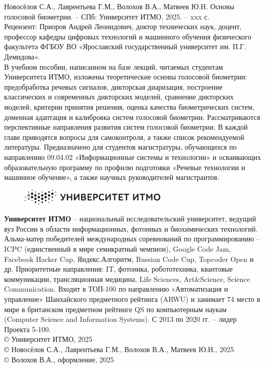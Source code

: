 \documentclass[12pt]{book}
\begin{document}
\thispagestyle{empty}

\noindent\large{Новосёлов С.А., Лаврентьева Г.М., Волохов В.А., Матвеев Ю.Н. Основы голосовой биометрии. – СПб: Университет ИТМО, 2025. – xxx с.} \\ [1ex]

\noindent\large{Рецензент: Приоров Андрей Леонидович, доктор технических наук, доцент, профессор кафедры цифровых технологий и машинного обучения физического факультета ФГБОУ ВО «Ярославский государственный университет им. П.Г. Демидова».} \\ [1ex]

\noindent\large{В учебном пособии, написанном на базе лекций, читаемых студентам Университета ИТМО, изложены теоретические основы голосовой биометрии: предобработка речевых сигналов, дикторская диаризация, построение классических и современных дикторских моделей, сравнение дикторских моделей, критерии принятия решения, оценка качества биометрических систем, доменная адаптация и калибровка систем голосовой биометрии. Рассматриваются перспективные направления развития систем голосовой биометрии. В каждой главе приводятся вопросы для самоконтроля, а также список рекомендуемой литературы. Предназначено для студентов магистратуры, обучающихся по направлению 09.04.02 «Информационные системы и технологии» и осваивающих образовательную программу по профилю подготовки «Речевые технологии и машинное обучение», а также научных руководителей магистрантов.}

\begin{figure}[h]
\includegraphics[width=7cm, right]{images/cover/logo_bw.png}
\end{figure}

\noindent\large{\textbf{Университет ИТМО} – национальный исследовательский университет, ведущий вуз России в области информационных, фотонных и биохимических технологий. Альма-матер победителей международных соревнований по программированию – ICPC (единственный в мире семикратный чемпион), Google Code Jam, Facebook Hacker Cup, Яндекс.Алгоритм, Russian Code Cup, Topcoder Open и др. Приоритетные направления: IT, фотоника, робототехника, квантовые коммуникации, трансляционная медицина, Life Sciences, Art\&Science, Science Communication. Входит в ТОП-100 по направлению «Автоматизация и управление» Шанхайского предметного рейтинга (ARWU) и занимает 74 место в мире в британском предметном рейтинге QS по компьютерным наукам (Computer Science and Information Systems). С 2013 по 2020 гг. – лидер Проекта 5-100.} \\ [1ex]

\noindent\large{\copyright \! Университет ИТМО, 2025 \\ 
\copyright \! Новосёлов С.А., Лаврентьева Г.М., Волохов В.А., Матвеев Ю.Н., 2025 \\
\copyright \! Волохов В.А., оформление, 2025}
\end{document}

